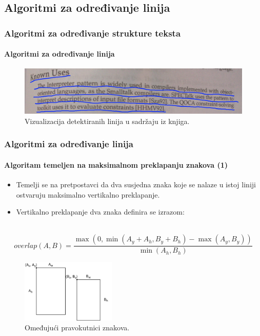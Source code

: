 \documentclass{beamer}
\begin{document}
\subsection{Algoritmi za određivanje linija}
\begin{frame}
\frametitle{Algoritmi za određivanje strukture teksta}
\framesubtitle{Algoritmi za određivanje linija}
\begin{figure}[htb]
    \centering
    \includegraphics[width=\textwidth]{images/line-segmentation-01.jpg}
    \caption{Vizualizacija detektiranih linija u sadržaju iz knjiga.}
    \label{fig:line-segmentation-01}
\end{figure}
\end{frame}
\begin{frame}
\frametitle{Algoritmi za određivanje linija}
\framesubtitle{Algoritam temeljen na maksimalnom preklapanju znakova (1)}
\begin{itemize}
    \item Temelji se na pretpostavci da dva susjedna znaka koje se nalaze u istoj
          liniji ostvaruju maksimalno vertikalno preklapanje.
    \item Vertikalno preklapanje dva znaka definira se izrazom:
\end{itemize}
\
\begin{equation}
\label{eq:overlap}
\textit{overlap}(A, B) =
\frac{\max(0, \min( A_y + A_h, B_y + B_h ) - \max( A_y, B_y ))}{\min(A_h, B_h)}
\end{equation}
\begin{figure}[htb]
    \centering
    \includegraphics[height=3cm]{images/chars-01.png}
    \caption{Omeđujući pravokutnici znakova.}
    \label{fig:chars-01}
\end{figure}
\end{frame}
\end{document}
